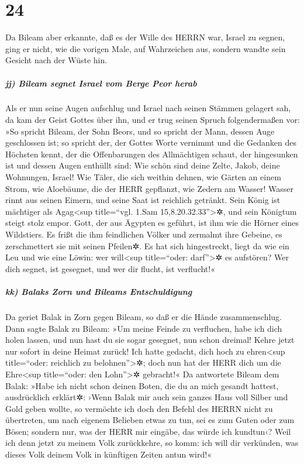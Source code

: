 \hypertarget{section-23}{%
\section{24}\label{section-23}}

Da Bileam aber erkannte, daß es der Wille des HERRN war,
Israel zu segnen, ging er nicht, wie die vorigen Male, auf Wahrzeichen
aus, sondern wandte sein Gesicht nach der Wüste hin.

\hypertarget{jj-bileam-segnet-israel-vom-berge-peor-herab}{%
\subparagraph{jj) Bileam segnet Israel vom Berge Peor
herab}\label{jj-bileam-segnet-israel-vom-berge-peor-herab}}

Als er nun seine Augen aufschlug und Israel nach seinen
Stämmen gelagert sah, da kam der Geist Gottes über ihn,
und er trug seinen Spruch folgendermaßen vor: »So spricht
Bileam, der Sohn Beors, und so spricht der Mann, dessen Auge geschlossen
ist; so spricht der, der Gottes Worte vernimmt und die
Gedanken des Höchsten kennt, der die Offenbarungen des Allmächtigen
schaut, der hingesunken ist und dessen Augen enthüllt sind:
Wie schön sind deine Zelte, Jakob, deine Wohnungen,
Israel! Wie Täler, die sich weithin dehnen, wie Gärten an
einem Strom, wie Aloebäume, die der HERR gepflanzt, wie Zedern am
Wasser! Wasser rinnt aus seinen Eimern, und seine Saat ist
reichlich getränkt. Sein König ist mächtiger als Agag\textless sup
title=``vgl. 1.Sam 15,8.20.32.33''\textgreater✲, und sein Königtum
steigt stolz empor. Gott, der aus Ägypten es geführt, ist
ihm wie die Hörner eines Wildstiers. Es frißt die ihm feindlichen Völker
und zermalmt ihre Gebeine, es zerschmettert sie mit seinen Pfeilen✲.
Es hat sich hingestreckt, liegt da wie ein Leu und wie
eine Löwin: wer will\textless sup title=``oder: darf''\textgreater✲ es
aufstören? Wer dich segnet, ist gesegnet, und wer dir flucht, ist
verflucht!«

\hypertarget{kk-balaks-zorn-und-bileams-entschuldigung}{%
\subparagraph{kk) Balaks Zorn und Bileams
Entschuldigung}\label{kk-balaks-zorn-und-bileams-entschuldigung}}

Da geriet Balak in Zorn gegen Bileam, so daß er die Hände
zusammenschlug. Dann sagte Balak zu Bileam: »Um meine Feinde zu
verfluchen, habe ich dich holen lassen, und nun hast du sie sogar
gesegnet, nun schon dreimal! Kehre jetzt nur sofort in
deine Heimat zurück! Ich hatte gedacht, dich hoch zu ehren\textless sup
title=``oder: reichlich zu belohnen''\textgreater✲; doch nun hat der
HERR dich um die Ehre\textless sup title=``oder: den Lohn''\textgreater✲
gebracht!« Da antwortete Bileam dem Balak: »Habe ich
nicht schon deinen Boten, die du an mich gesandt hattest, ausdrücklich
erklärt✲: ›Wenn Balak mir auch sein ganzes Haus voll
Silber und Gold geben wollte, so vermöchte ich doch den Befehl des HERRN
nicht zu übertreten, um nach eigenem Belieben etwas zu tun, sei es zum
Guten oder zum Bösen; sondern nur, was der HERR mir eingäbe, das würde
ich kundtun‹? Weil ich denn jetzt zu meinem Volk
zurückkehre, so komm: ich will dir verkünden, was dieses Volk deinem
Volk in künftigen Zeiten antun wird!«

